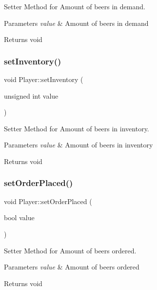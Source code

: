 Setter Method for Amount of beers in demand. 


\begin{DoxyParams}{Parameters}
{\em value} & Amount of beers in demand \\
\hline
\end{DoxyParams}
\begin{DoxyReturn}{Returns}
void 
\end{DoxyReturn}
\mbox{\label{classPlayer_a26403ca486d7a34a5a27397eee42d531}} 
\subsubsection{\texorpdfstring{set\+Inventory()}{setInventory()}}
{\footnotesize\ttfamily void Player\+::set\+Inventory (\begin{DoxyParamCaption}\item[{unsigned int}]{value }\end{DoxyParamCaption})}



Setter Method for Amount of beers in inventory. 


\begin{DoxyParams}{Parameters}
{\em value} & Amount of beers in inventory \\
\hline
\end{DoxyParams}
\begin{DoxyReturn}{Returns}
void 
\end{DoxyReturn}
\mbox{\label{classPlayer_a1afe9b0b034e8c8544fc745abcf47448}} 
\subsubsection{\texorpdfstring{set\+Order\+Placed()}{setOrderPlaced()}}
{\footnotesize\ttfamily void Player\+::set\+Order\+Placed (\begin{DoxyParamCaption}\item[{bool}]{value }\end{DoxyParamCaption})}



Setter Method for Amount of beers ordered. 


\begin{DoxyParams}{Parameters}
{\em value} & Amount of beers ordered \\
\hline
\end{DoxyParams}
\begin{DoxyReturn}{Returns}
void 
\end{DoxyReturn}
\mbox{\label{classPlayer_abb73217aac5315b6d78c58feb25a88df}} 
